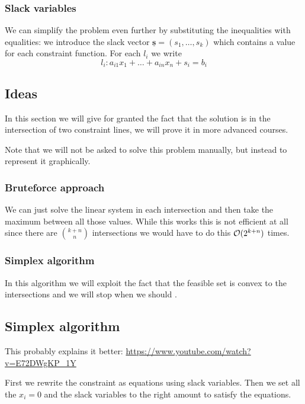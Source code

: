 \documentclass[14pt]{extarticle}
\renewcommand{\vec}[1]{\underline{\mathbf{#1}}}
\begin{document}
\subsubsection{Slack variables}

We can simplify the problem even further by substituting the inequalities with equalities:
we introduce the slack vector $\vec s = (s_1, \ldots, s_k)$ which contains a value for each constraint function.
For each $l_i$ we write
\begin{equation}
    l_i: a_{i1} x_1 + \dots + a_{in} x_n + s_i = b_i
\end{equation}

\subsection{Ideas}

In this section we will give for granted the fact that the solution is in the intersection of two constraint lines, we will prove it in more advanced courses.

Note that we will not be asked to solve this problem manually, but instead to represent it graphically.

\subsubsection{Bruteforce approach}

We can just solve the linear system in each intersection and then take the maximum between all those values.
While this works this is not efficient at all since there are $\binom{k+n}{n}$ intersections we would have to do this $\mathcal{O}(2^{k+n})$ times.

\subsubsection{Simplex algorithm}

In this algorithm we will exploit the fact that the feasible set is convex to  the intersections and we will stop when we should .

\subsection{Simplex algorithm}

This probably explains it better:
\url{https://www.youtube.com/watch?v=E72DWgKP_1Y}

First we rewrite the constraint as equations using slack variables.
Then we set all the $x_i = 0$ and the slack variables to the right amount to satisfy the equations.
\end{document}
